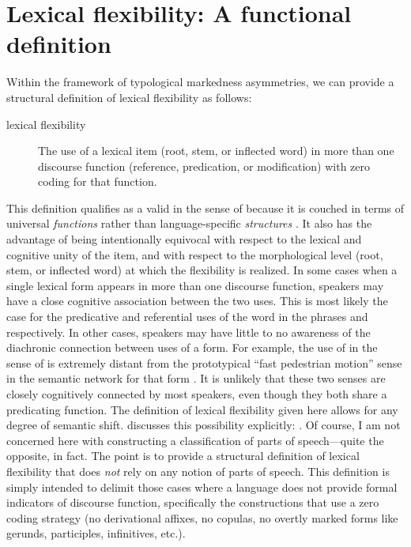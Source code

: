 \section{Lexical flexibility: A functional definition}
\label{sec:2.5}

Within the framework of typological markedness asymmetries, we can provide a structural definition of lexical flexibility as follows:

\begin{description}
  \item[lexical flexibility] The use of a lexical item (root, stem, or inflected word) in more than one discourse function (reference, predication, or modification) with zero coding for that function.
\end{description}

\noindent This definition qualifies as a valid  in the sense of \textcite{Haspelmath2010a} because it is couched in terms of universal \emph{functions} rather than language-specific \emph{structures} \parencite{Croft2016}. It also has the advantage of being intentionally equivocal with respect to the lexical and cognitive unity of the item, and with respect to the morphological level (root, stem, or inflected word) at which the flexibility is realized. In some cases when a single lexical form appears in more than one discourse function, speakers may have a close cognitive association between the two uses. This is most likely the case for the predicative and referential uses of the word  in the phrases  and  respectively. In other cases, speakers may have little to no awareness of the diachronic connection between uses of a form. For example, the use of  in the sense of  is extremely distant from the prototypical \enquote{fast pedestrian motion} sense in the semantic network for that form . It is unlikely that these two senses are closely cognitively connected by most speakers, even though they both share a predicating function. The definition of lexical flexibility given here allows for any degree of semantic shift. \citeauthor{Croft2001b} discusses this possibility explicitly: . Of course, I am not concerned here with constructing a classification of parts of speech—quite the opposite, in fact. The point is to provide a structural definition of lexical flexibility that does \emph{not} rely on any notion of parts of speech. This definition is simply intended to delimit those cases where a language does not provide formal indicators of discourse function, specifically the constructions that use a zero coding strategy (no derivational affixes, no copulas, no overtly marked forms like gerunds, participles, infinitives, etc.).

